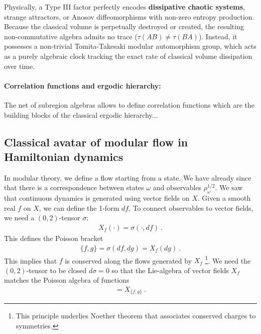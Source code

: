 \documentclass[a4paper,11pt]{article}
\theoremstyle{definition}
\begin{document}
Physically, a Type III factor perfectly encodes \textbf{dissipative chaotic systems}, strange attractors, or Anosov diffeomorphisms with non-zero entropy production. Because the classical volume is perpetually destroyed or created, the resulting non-commutative algebra admits no trace ($\tau(AB) \neq \tau(BA)$). Instead, it possesses a non-trivial Tomita-Takesaki modular automorphism group, which acts as a purely algebraic clock tracking the exact rate of classical volume dissipation over time.

\paragraph{Correlation functions and ergodic hierarchy:}
The net of subregion algebras allows to define correlation functions which are the building blocks of the classical ergodic hierarchy...
 
\subsection{Classical avatar of modular flow in Hamiltonian dynamics}

In modular theory, we define a flow starting from a state. 
We have already since that there is a correspondence between states $\omega$ and observables $\rho_\omega^{1/2}$. We saw that continuous dynamics is generated using vector fields on $X$. Given a smooth real $f$ on $X$, we can define the 1-form $df$. To connect observables to vector fields, we need a $(0,2)$-tensor $\sigma$: 
\begin{align}
    X_f(\cdot)=\sigma(\cdot,df)\ .
\end{align}
This defines the Poisson bracket
\begin{align}
    \{f,g\}=\sigma(df,dg)=X_f(dg)\ .
\end{align}
This implies that $f$ is conserved along the flows generated by $X_f$ \footnote{This principle underlies Noether theorem that associates conserved charges to symmetries.}. We need the $(0,2)$-tensor to be closed $d\sigma=0$ so that the Lie-algebra of vector fields $X_f$ matches the Poisson algebra of functions 
\begin{align}
    [X_f,X_g]=X_{\{f,g\}}\ .
\end{align}
\end{document}

